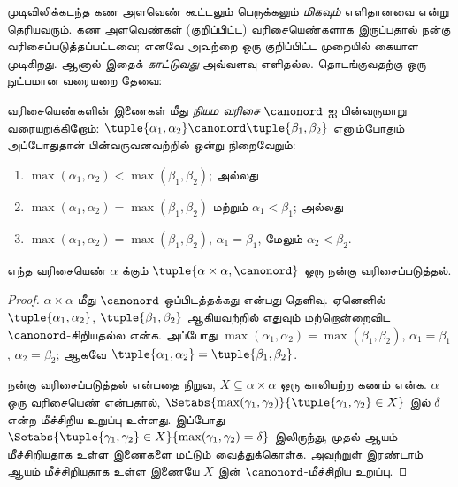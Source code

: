 \documentclass[../../../include/open-logic-section]{subfiles}
\begin{document}

முடிவிலிக்கடந்த கண அளவெண் கூட்டலும் பெருக்கலும்
\emph{மிகவும்} எளிதானவை என்று தெரியவரும். கண அளவெண்கள்
(குறிப்பிட்ட) வரிசையெண்களாக இருப்பதால் நன்கு வரிசைப்படுத்தப்பட்டவை;
எனவே அவற்றை ஒரு குறிப்பிட்ட முறையில் கையாள முடிகிறது.
ஆனால் இதைக் \emph{காட்டுவது} அவ்வளவு எளிதல்ல.
தொடங்குவதற்கு ஒரு நுட்பமான வரையறை தேவை:

\begin{defn}
வரிசையெண்களின் இணைகள் மீது \emph{நியம வரிசை} $\canonord$ ஐ
பின்வருமாறு வரையறுக்கிறோம்: $\tuple{\alpha_1, \alpha_2} \canonord
\tuple{\beta_1, \beta_2}$ எனும்போதும் அப்போதுதான் பின்வருவனவற்றில்
ஒன்று நிறைவேறும்:
\begin{enumerate}
	\item $\max(\alpha_1, \alpha_2) < \max(\beta_1, \beta_2)$; அல்லது
	\item $\max(\alpha_1, \alpha_2) = \max(\beta_1, \beta_2)$ மற்றும்
	$\alpha_1 < \beta_1$; அல்லது
	\item $\max(\alpha_1, \alpha_2) = \max(\beta_1, \beta_2)$,
	$\alpha_1 = \beta_1$, மேலும் $\alpha_2 < \beta_2$.
\end{enumerate}
\end{defn}

\begin{lem}
எந்த வரிசையெண் $\alpha$ க்கும்
$\tuple{\alpha \times \alpha, \canonord}$ ஒரு நன்கு வரிசைப்படுத்தல்.
\end{lem}

\begin{proof}
$\alpha \times \alpha$ மீது $\canonord$ ஒப்பிடத்தக்கது என்பது
தெளிவு. ஏனெனில் $\tuple{\alpha_1, \alpha_2}$,
$\tuple{\beta_1, \beta_2}$ ஆகியவற்றில் எதுவும் மற்றொன்றைவிட
$\canonord$-சிறியதல்ல என்க. அப்போது
$\max(\alpha_1, \alpha_2) = \max(\beta_1, \beta_2)$,
$\alpha_1 = \beta_1$, $\alpha_2 = \beta_2$; ஆகவே
$\tuple{\alpha_1, \alpha_2} = \tuple{\beta_1,  \beta_2}$.

நன்கு வரிசைப்படுத்தல் என்பதை நிறுவ,
$X \subseteq \alpha\times\alpha$ ஒரு காலியற்ற கணம் என்க.
$\alpha$ ஒரு வரிசையெண் என்பதால்,
$\Setabs{\max(\gamma_1, \gamma_2)}{\tuple{\gamma_1,
\gamma_2} \in X}$ இல் $\delta$ என்ற மீச்சிறிய உறுப்பு உள்ளது.
இப்போது $\Setabs{\tuple{\gamma_1,\gamma_2} \in X}{\max(\gamma_1, \gamma_2) =
\delta}$ இலிருந்து, முதல் ஆயம் மீச்சிறியதாக உள்ள இணைகளை மட்டும்
வைத்துக்கொள்க. அவற்றுள் இரண்டாம் ஆயம் மீச்சிறியதாக உள்ள இணையே
$X$ இன் $\canonord$-மீச்சிறிய உறுப்பு.
\end{proof}
\noindent
\end{document}
